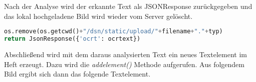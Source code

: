 Nach der Analyse wird der erkannte Text als JSONResponse zurückgegeben und das lokal hochgeladene Bild wird wieder vom Server gelöscht.

\begin{lstlisting}[caption={Fileentfernung und Rückgabe des OCR-Textes}, language=Python]
os.remove(os.getcwd()+"/dsn/static/upload/"+filename+"."+typ)
return JsonResponse({'ocrt': ocrtext})
\end{lstlisting}

\newpage

Abschließend wird mit dem daraus analysierten Text ein neues Textelement im Heft erzeugt. Dazu wird die \textit{addelement()} Methode aufgerufen. Aus folgendem Bild ergibt sich dann das folgende Textelement.




